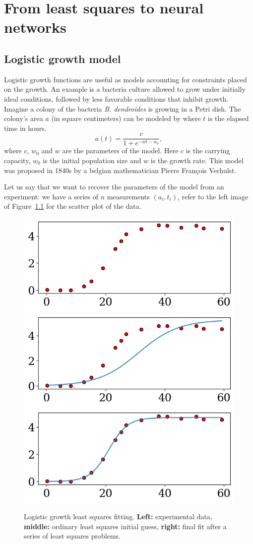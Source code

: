 \documentclass[notitlepage,oneside]{book}
\begin{document}
\chapter{From least squares to neural networks}
\section{Logistic growth model}
Logistic growth functions are useful as models accounting for constraints placed on the growth.
An example is a bacteria culture allowed to grow under initially ideal conditions, followed by less favorable conditions that inhibit growth.
Imagine a colony of the bacteria \textit{B. dendroides} is growing in a Petri dish. The colony's area $a$ (in square centimeters) can be modeled by where $t$ is the elapsed time in hours.
\begin{equation}
\label{eq:logistic-growth}
a(t) = \frac{c}{1+e^{-wt - w_0}},
\end{equation}
where $c$, $w_0$ and $w$ are the parameters of the model. Here $c$ is the carrying capacity, $w_0$ is the initial population size and $w$ is the growth rate.
This model was proposed in 1840s by a belgian mathematician Pierre François Verhulst.

Let us say that we want to recover the parameters of the model from an experiment: we have a series of $n$ measurements $(a_i, t_i)$, refer to the left image of Figure~\ref{fig:logistic-growth} for the scatter plot of the data.
\begin{figure}[htb]
    \centering
    \includegraphics[width=.32\linewidth]{example_8.1_a.png}
    \includegraphics[width=.32\linewidth]{example_8.1_b.png}
    \includegraphics[width=.32\linewidth]{example_8.1_c.png}
    \caption{Logistic growth least squares fitting. \textbf{Left:} experimental data, \textbf{middle: } ordinary least squares initial guess, \textbf{right:} final fit after a series of least squares problems.}
    \label{fig:logistic-growth}
\end{figure}
\end{document}
